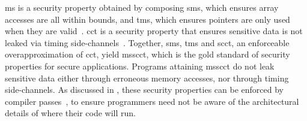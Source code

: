 \documentclass[dvipsnames]{llncs}
\begin{document}

\gls*{ms} is a security property obtained by composing \gls*{sms}, which ensures array accesses are all within bounds, and \gls*{tms}, which ensures pointers are only used when they are valid~\cite{azevedo2018meaningsofms,jim2002cyclone,necula2005ccured,nagarakatte2010cets,nagarakatte2009soft,akritidis2009baggy,michael2023mswasm}.
\gls*{cct} is a security property that ensures sensitive data is not leaked via timing side-channels~\cite{kocher1996timing}.
Together, \gls*{sms}, \gls*{tms} and \gls*{scct}, an enforceable overapproximation of \gls*{cct}, yield \gls*{msscct}, which is the gold standard of security properties for secure applications.
Programs attaining \gls*{msscct} do not leak sensitive data either through erroneous memory accesses, nor through timing side-channels.
As discussed in , these security properties can be enforced by compiler passes~\cite{bond2017vale,almeida2017jasmin}, to ensure programmers need not be aware of the architectural details of where their code will run.
\end{document}
